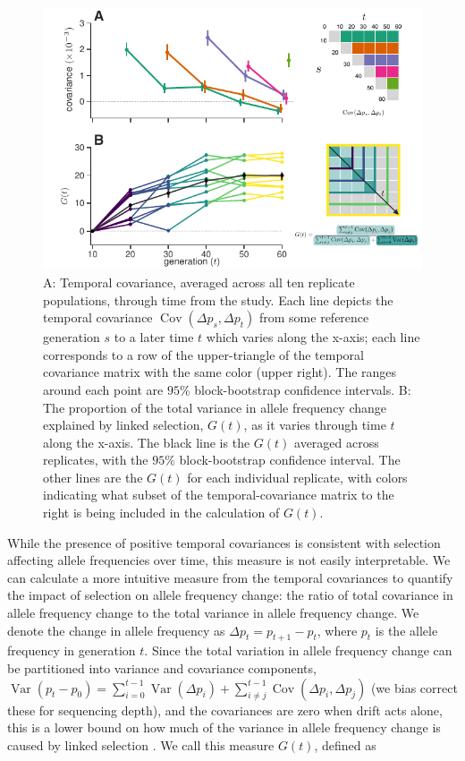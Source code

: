 \documentclass[11pt]{article}
\DeclareMathOperator{\var}{Var}
\DeclareMathOperator{\cov}{Cov}
\providecommand{\DIFaddbeginFL}{} %
\providecommand{\DIFaddendFL}{} %
\providecommand{\DIFdelbeginFL}{} %
\providecommand{\DIFdelendFL}{} %
\begin{document}
\begin{figure}[!htb]
  \centering
  \DIFdelbeginFL %
\DIFdelendFL \DIFaddbeginFL \includegraphics[width=\textwidth]{figures/figure-1-revision.pdf}
\DIFaddendFL 

  \caption{A: Temporal covariance, averaged across all ten replicate
    populations, through time from the \textcite{Barghi2019-qy} study. Each
    line depicts the temporal covariance $\cov(\Delta p_s, \Delta p_t)$ from
    some reference generation $s$ to a later time $t$ which varies along the
    x-axis; each line corresponds to a row of the upper-triangle of the
    temporal covariance matrix with the same color (upper right). The ranges
    around each point are $95\%$ block-bootstrap confidence intervals. B: The
    proportion of the total variance in allele frequency change explained by
    linked selection, $G(t)$, as it varies through time $t$ along the x-axis.
    The black line is the $G(t)$ averaged across replicates, with the $95\%$
    block-bootstrap confidence interval. The other lines are the $G(t)$ for
    each individual replicate, with colors indicating what subset of the
    temporal-covariance matrix to the right is being included in the
  calculation of $G(t)$.}

  \label{fig:figure-1}
\end{figure}

While the presence of positive temporal covariances is consistent with
selection affecting allele frequencies over time, this measure is not easily
interpretable. We can calculate a more intuitive measure from the temporal
covariances to quantify the impact of selection on allele frequency change: the
ratio of total covariance in allele frequency change to the total variance in
allele frequency change. We denote the change in allele frequency as $\Delta
p_t = p_{t+1}-p_t$, where $p_t$ is the allele frequency in generation $t$.
Since the total variation in allele frequency change can be partitioned into
variance and covariance components, $\var(p_t - p_0) = \sum_{i=0}^{t-1}
\var(\Delta p_i) + \sum_{i \ne j}^{t-1} \cov(\Delta p_i, \Delta p_j)$ (we bias
correct these for sequencing depth), and the covariances are zero when drift
acts alone, this is a lower bound on how much of the variance in allele
frequency change is caused by linked selection \parencite{Buffalo2019-io}. We
call this measure $G(t)$, defined as
\end{document}
